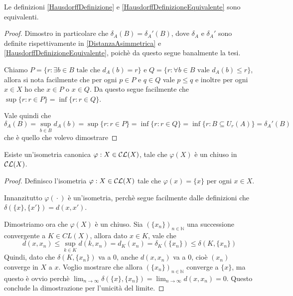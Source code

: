 \begin{theorem}
	Le definizioni \cref{HausdorffDefinizione} e \cref{HausdorffDefinizioneEquivalente} sono equivalenti.
\end{theorem}
\begin{proof}
	Dimostro in particolare che $\delta_A(B)=\delta_A'(B)$, dove $\delta_A$ e $\delta_A'$ sono definite rispettivamente in \cref{DistanzaAsimmetrica} e \cref{HausdorffDefinizioneEquivalente}, poichè da questo segue banalmente la tesi.
	
	Chiamo $P=\{ r : \exists b\in B \text{ tale che }d_A(b)=r \}$ e $Q=\{ r: \forall b\in B\text{ vale } d_A(b)\le r \}$, allora si nota facilmente che per ogni $p\in P$ e $q\in Q$ vale $p\le q$ e inoltre per ogni $x\in X$ ho che $x\in P$ o $x\in Q$. Da questo segue facilmente che $\sup\{ r: r\in P \}=\inf\{r: r\in Q \}$.
	
	Vale quindi che
	\begin{equation*}
		\delta_A(B)=\sup_{b\in B} d_A(b)=\sup\{ r : r\in P \}=\inf\{ r : r\in Q \}= \inf\{ r : B\subseteq U_r(A) \}=\delta_A'(B)
	\end{equation*}
	che è quello che volevo dimostrare
\end{proof}

\begin{lemma}\label{IsometriaCanonica}
	Esiste un'isometria canonica $\varphi: X\in \mathcal{CL}(X)$, tale che $\varphi(X)$ è un chiuso in $\mathcal{CL}(X)$.
\end{lemma}
\begin{proof}
	Definisco l'isometria $\varphi: X\in\mathcal{CL}(X)$ tale che $\varphi(x)=\{x\}$ per ogni $x\in X$. 
	
	Innanzitutto $\varphi({}\cdot{})$ è un'isometria, perchè segue facilmente dalle definizioni che $\delta(\{ x \}, \{ x' \})=d(x,x')$.
	
	Dimostriamo ora che $\varphi(X)$ è un chiuso. Sia $(\{ x_n \})_{n\in \mathbb{N}}$ una successione convergente a $K\in CL(X)$, allora dato $x\in K$, vale che
	\begin{equation*}
		d(x,x_n)\le \sup_{k\in K} d(k,x_n)=d_K(x_n)=\delta_K(\{x_n\})\le \delta(K,\{x_n \})
	\end{equation*}
	Quindi, dato che $\delta(K,\{x_n \})$ va a 0, anche $d(x,x_n)$ va a 0, cioè $(x_n)$ converge in $X$ a $x$. Voglio mostrare che allora $(\{ x_n \})_{n\in \mathbb{N}}$ converge a $\{ x \}$, ma questo è ovvio perchè $\lim_{n\to\infty} \delta(\{x\}, \{ x_n \})=\lim_{n\to\infty} d(x,x_n)=0$. Questo conclude la dimostrazione per l'unicità del limite.
\end{proof}









